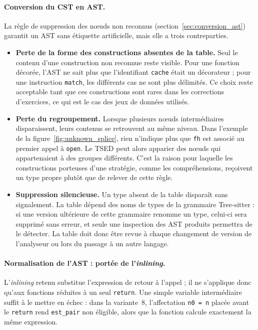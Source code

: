 \documentclass[12pt,a4paper,oneside]{report}
\begin{document}
\paragraph{Conversion du CST en AST.}
\label{sec:limites_conversion}
La règle de suppression des nœuds non reconnus
(section~\ref{sec:conversion_ast}) garantit un AST sans étiquette
artificielle, mais elle a trois contreparties.
\begin{itemize}
  \item \textbf{Perte de la forme des constructions absentes de la table.}
        Seul le contenu d'une construction non reconnue reste visible. Pour
        une fonction décorée, l'AST ne sait plus que l'identifiant
        \texttt{cache} était un décorateur ; pour une instruction
        \texttt{match}, les différents cas ne sont plus délimités. Ce choix
        reste acceptable tant que ces constructions sont rares dans les
        corrections d'exercices, ce qui est le cas des jeux de données
        utilisés.
  \item \textbf{Perte du regroupement.} Lorsque plusieurs nœuds intermédiaires
        disparaissent, leurs contenus se retrouvent au même niveau. Dans
        l'exemple de la figure~\ref{fig:unknown_splice}, rien n'indique plus
        que \texttt{fh} est associé au premier appel à \texttt{open}. Le TSED
        peut alors apparier des nœuds qui appartenaient à des groupes
        différents. C'est la raison pour laquelle les constructions porteuses
        d'une stratégie, comme les compréhensions, reçoivent un type propre
        plutôt que de relever de cette règle.
  \item \textbf{Suppression silencieuse.} Un type absent de la table disparaît
        sans signalement. La table dépend des noms de types de la grammaire
        Tree-sitter : si une version ultérieure de cette grammaire renomme
        un type, celui-ci sera supprimé sans erreur, et seule une
        inspection des AST produits permettra de le détecter. La table doit
        donc être revue à chaque changement de version de l'analyseur ou
        lors du passage à un autre langage.
\end{itemize}

\paragraph{Normalisation de l'AST : portée de l'\emph{inlining}.}
L'\emph{inlining} retenu substitue l'expression de retour à l'appel ; il ne
s'applique donc qu'aux fonctions réduites à un seul \texttt{return}. Une
simple variable intermédiaire suffit à le mettre en échec : dans la
variante~8, l'affectation \texttt{n0 = n} placée avant le \texttt{return}
rend \texttt{est\_pair} non éligible, alors que la fonction calcule
exactement la même expression.
\end{document}
